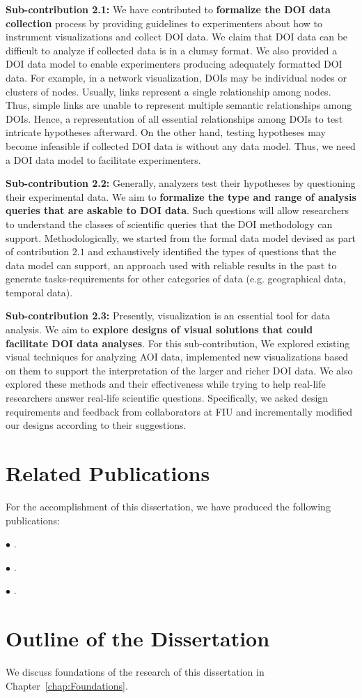 \textbf{Sub-contribution 2.1:} We have contributed to \textbf{formalize the DOI data collection} process by providing guidelines to experimenters about how to instrument visualizations and collect DOI data. We claim that DOI data can be difficult to analyze if collected data is in a clumsy format. We also provided a DOI data model to enable experimenters producing adequately formatted DOI data. For example, in a network visualization, DOIs may be individual nodes or clusters of nodes. Usually,  links represent a single relationship among nodes. Thus, simple links are unable to represent multiple semantic relationships among DOIs. Hence, a representation of all essential relationships among DOIs to test intricate hypotheses afterward. On the other hand, testing hypotheses may become infeasible if collected DOI data is without any data model. Thus, we need a DOI data model to facilitate experimenters. 

\textbf{Sub-contribution 2.2:} Generally, analyzers test their hypotheses by questioning their experimental data. We aim to \textbf{formalize the type and range of analysis queries that are askable to DOI data}. Such questions will allow researchers to understand the classes of scientific queries that the DOI methodology can support. Methodologically, we started from the formal data model devised as part of contribution $2.1$ and exhaustively identified the types of questions that the data model can support, an approach used with reliable results in the past to generate tasks-requirements for other categories of data (e.g. geographical data, temporal data). 

\textbf{Sub-contribution 2.3:} Presently, visualization is an essential tool for data analysis. We aim to \textbf{explore designs of visual solutions that could facilitate DOI data analyses}. For this sub-contribution, We explored existing visual techniques for analyzing AOI data, implemented new visualizations based on them to support the interpretation of the larger and richer DOI data. We also explored these methods and their effectiveness while trying to help real-life researchers answer real-life scientific questions. Specifically, we asked design requirements and feedback from collaborators at FIU and incrementally modified our designs according to their suggestions. 

\section{Related Publications}
For the accomplishment of this dissertation, we have produced the following publications:

$\bullet$ .    

$\bullet$ .

$\bullet$ .

\section{Outline of the Dissertation}
We discuss foundations of the research of this dissertation in Chapter~\ref{chap:Foundations}. 
